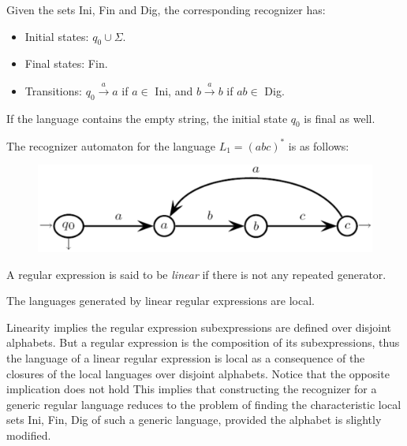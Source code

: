 Given the sets Ini, Fin and Dig, the corresponding recognizer has:
\begin{itemize}
    \item Initial states: $q_0 \cup \Sigma$.
    \item Final states: Fin.
    \item Transitions: $q_0 \overset{a}{\rightarrow}a$ if $a \in$ Ini, and $b \overset{a}{\rightarrow}b$ if $ab \in$ Dig.
\end{itemize}
If the language contains the empty string, the initial state $q_0$ is final as well.
\begin{example}
    The recognizer automaton for the language $L_1=(abc)^{*}$ is as follows: 
    \begin{figure}[H]
        \centering
        \includegraphics[width=0.5\linewidth]{images/local.png}
    \end{figure}
\end{example}
\begin{definition}
    A regular expression is said to be \emph{linear} if there is not any repeated generator. 
\end{definition}
\begin{property}
    The languages generated by linear regular expressions are local. 
\end{property}
Linearity implies the regular expression subexpressions are defined over disjoint alphabets.
But a regular expression is the composition of its subexpressions, thus the language of a linear regular expression is local as a consequence of the closures of the local languages over disjoint alphabets. 
Notice that the opposite implication does not hold
This implies that constructing the recognizer for a generic regular language reduces to the problem of finding the characteristic local sets Ini, Fin, Dig of such a generic language, provided the alphabet is slightly modified. 

